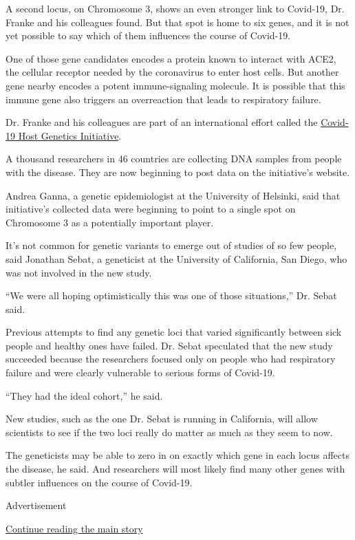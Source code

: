A second locus, on Chromosome 3, shows an even stronger link to
Covid-19, Dr. Franke and his colleagues found. But that spot is home to
six genes, and it is not yet possible to say which of them influences
the course of Covid-19.

One of those gene candidates encodes a protein known to interact with
ACE2, the cellular receptor needed by the coronavirus to enter host
cells. But another gene nearby encodes a potent immune-signaling
molecule. It is possible that this immune gene also triggers an
overreaction that leads to respiratory failure.

Dr. Franke and his colleagues are part of an international effort called
the \href{https://www.covid19hg.org/}{Covid-19 Host Genetics
Initiative}.

A thousand researchers in 46 countries are collecting DNA samples from
people with the disease. They are now beginning to post data on the
initiative's website.

Andrea Ganna, a genetic epidemiologist at the University of Helsinki,
said that initiative's collected data were beginning to point to a
single spot on Chromosome 3 as a potentially important player.

It's not common for genetic variants to emerge out of studies of so few
people, said Jonathan Sebat, a geneticist at the University of
California, San Diego, who was not involved in the new study.

``We were all hoping optimistically this was one of those situations,''
Dr. Sebat said.

Previous attempts to find any genetic loci that varied significantly
between sick people and healthy ones have failed. Dr. Sebat speculated
that the new study succeeded because the researchers focused only on
people who had respiratory failure and were clearly vulnerable to
serious forms of Covid-19.

``They had the ideal cohort,'' he said.

New studies, such as the one Dr. Sebat is running in California, will
allow scientists to see if the two loci really do matter as much as they
seem to now.

The geneticists may be able to zero in on exactly which gene in each
locus affects the disease, he said. And researchers will most likely
find many other genes with subtler influences on the course of Covid-19.

Advertisement

\protect\hyperlink{after-bottom}{Continue reading the main story}

